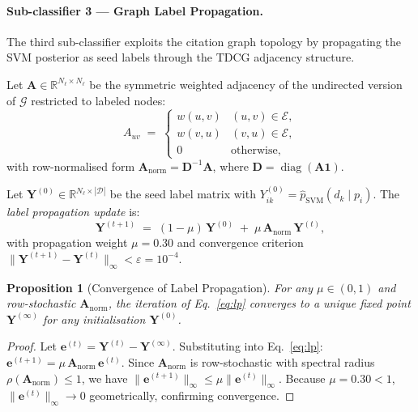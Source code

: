 \documentclass[letterpaper]{article}
\theoremstyle{plain}
\newtheorem{proposition}[theorem]{Proposition}
\theoremstyle{definition}
\theoremstyle{remark}
\newcommand{\G}{\mathcal{G}}
\newcommand{\E}{\mathcal{E}}
\newcommand{\D}{\mathcal{D}}
\newcommand{\Y}{\mathbf{Y}}
\newcommand{\A}{\mathbf{A}}
\newcommand{\R}{\mathbb{R}}
\begin{document}
\paragraph{Sub-classifier 3 --- Graph Label Propagation.}
The third sub-classifier exploits the citation graph
topology by propagating the SVM posterior as seed labels
through the TDCG adjacency structure.

\noindent
Let $\A \in \R^{N_\ell \times N_\ell}$ be the symmetric
weighted adjacency of the undirected version of $\G$
restricted to labeled nodes:
\begin{equation}
    A_{uv}
    \;=\;
    \begin{cases}
        w(u,v) & (u,v) \in \E, \\
        w(v,u) & (v,u) \in \E, \\
        0       & \text{otherwise},
    \end{cases}
    \label{eq:adj}
\end{equation}
with row-normalised form
$\A_{\mathrm{norm}} = \mathbf{D}^{-1}\A$,
where $\mathbf{D} = \operatorname{diag}(\A\mathbf{1})$.

\noindent
Let $\Y^{(0)} \in \R^{N_\ell \times |\D|}$ be the seed
label matrix with
$Y^{(0)}_{ik} = \hat{p}_{\mathrm{SVM}}(d_k \mid p_i)$.
The \emph{label propagation update} is:
\begin{equation}
    \Y^{(t+1)}
    \;=\;
    (1 - \mu)\,\Y^{(0)}
    \;+\;
    \mu\,\A_{\mathrm{norm}}\,\Y^{(t)},
    \label{eq:lp}
\end{equation}
with propagation weight $\mu = 0.30$ and convergence
criterion $\|\Y^{(t+1)} - \Y^{(t)}\|_\infty < \varepsilon = 10^{-4}$.

\begin{proposition}[Convergence of Label Propagation]
\label{prop:convergence}
For any $\mu \in (0,1)$ and row-stochastic
$\A_{\mathrm{norm}}$, the iteration of
Eq.~\eqref{eq:lp} converges to a unique fixed point
$\Y^{(\infty)}$ for any initialisation $\Y^{(0)}$.
\end{proposition}

\begin{proof}
Let $\mathbf{e}^{(t)} = \Y^{(t)} - \Y^{(\infty)}$.
Substituting into Eq.~\eqref{eq:lp}:
$\mathbf{e}^{(t+1)} = \mu\,\A_{\mathrm{norm}}\,\mathbf{e}^{(t)}$.
Since $\A_{\mathrm{norm}}$ is row-stochastic with
spectral radius $\rho(\A_{\mathrm{norm}}) \leq 1$,
we have
$\|\mathbf{e}^{(t+1)}\|_\infty
\leq \mu \|\mathbf{e}^{(t)}\|_\infty$.
Because $\mu = 0.30 < 1$,
$\|\mathbf{e}^{(t)}\|_\infty \to 0$ geometrically,
confirming convergence.
\end{proof}
\end{document}
